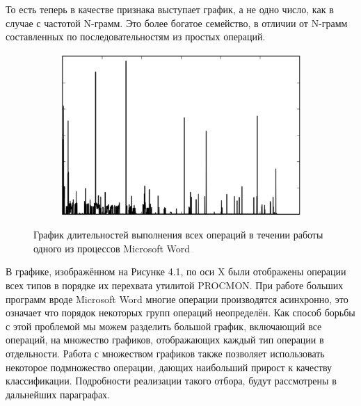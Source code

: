 То есть теперь в качестве признака выступает график, а не одно число, как в случае с частотой N-грамм. Это более богатое семейство, в отличии от N-грамм составленных по последовательностям из простых операций.

\newpage
\begin{figure}[ht]
	\centering
    \begin{subfigure}[b]{1\textwidth}
    \centering
        \includegraphics[scale=0.5]{pasted-image-29.png}
    \end{subfigure}
 
    \caption{График длительностей выполнения всех операций в течении работы одного из процессов Microsoft Word}
    \label{fig_parsetree}
\end{figure}

В графике, изображённом на Рисунке 4.1, по оси X были отображены операции всех типов в порядке их перехвата утилитой PROCMON. При работе больших программ вроде Microsoft Word многие операции производятся асинхронно, это означает что порядок некоторых групп операций неопределён. Как способ борьбы с этой проблемой мы можем разделить большой график, включающий все операций, на множество графиков, отображающих каждый тип операции в отдельности. Работа с множеством графиков также позволяет использовать некоторое подмножество операции, дающих наибольший прирост к качеству классификации. Подробности реализации такого отбора, будут рассмотрены в дальнейших параграфах.

